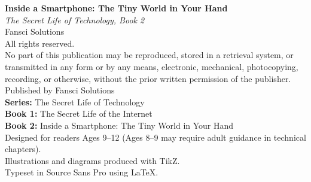 
\thispagestyle{empty}
\vspace*{\fill}

\begin{flushleft}
  \textbf{Inside a Smartphone: The Tiny World in Your Hand}\\
  \emph{The Secret Life of Technology, Book 2}\\
  \vspace{12pt}
  \textcopyright{} \the\year{} Fansci Solutions\\
  All rights reserved.\\
  \vspace{12pt}
  No part of this publication may be reproduced, stored in a retrieval system,
  or transmitted in any form or by any means, electronic, mechanical, photocopying,
  recording, or otherwise, without the prior written permission of the publisher.\\
  \vspace{12pt}
  Published by Fansci Solutions\\
  \vspace{12pt}
  \textbf{Series:} The Secret Life of Technology\\
  \textbf{Book 1:} The Secret Life of the Internet\\
  \textbf{Book 2:} Inside a Smartphone: The Tiny World in Your Hand\\
  \vspace{12pt}
  Designed for readers Ages 9--12 (Ages 8--9 may require adult guidance in technical chapters).\\
  \vspace{12pt}
  Illustrations and diagrams produced with TikZ.\\
  Typeset in Source Sans Pro using \LaTeX.\\
\end{flushleft}

\vspace*{\fill}
\clearpage
